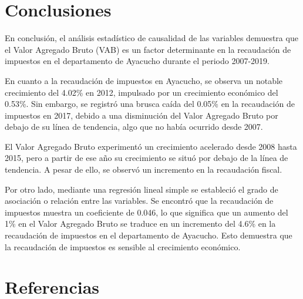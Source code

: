 \documentclass[
  jou,
  floatsintext,
  longtable,
  a4paper,
  nolmodern,
  notxfonts,
  notimes,
  12pt,
  colorlinks=true,linkcolor=blue,citecolor=blue,urlcolor=blue]{apa7}
\begin{document}
\section{Conclusiones}\label{conclusiones}

En conclusión, el análisis estadístico de causalidad de las variables
demuestra que el Valor Agregado Bruto (VAB) es un factor determinante en
la recaudación de impuestos en el departamento de Ayacucho durante el
periodo 2007-2019.

En cuanto a la recaudación de impuestos en Ayacucho, se observa un
notable crecimiento del 4.02\% en 2012, impulsado por un crecimiento
económico del 0.53\%. Sin embargo, se registró una brusca caída del
0.05\% en la recaudación de impuestos en 2017, debido a una disminución
del Valor Agregado Bruto por debajo de su línea de tendencia, algo que
no había ocurrido desde 2007.

El Valor Agregado Bruto experimentó un crecimiento acelerado desde 2008
hasta 2015, pero a partir de ese año su crecimiento se situó por debajo
de la línea de tendencia. A pesar de ello, se observó un incremento en
la recaudación fiscal.

Por otro lado, mediante una regresión lineal simple se estableció el
grado de asociación o relación entre las variables. Se encontró que la
recaudación de impuestos muestra un coeficiente de 0.046, lo que
significa que un aumento del 1\% en el Valor Agregado Bruto se traduce
en un incremento del 4.6\% en la recaudación de impuestos en el
departamento de Ayacucho. Esto demuestra que la recaudación de impuestos
es sensible al crecimiento económico.

\section{Referencias}\label{referencias}
\end{document}
